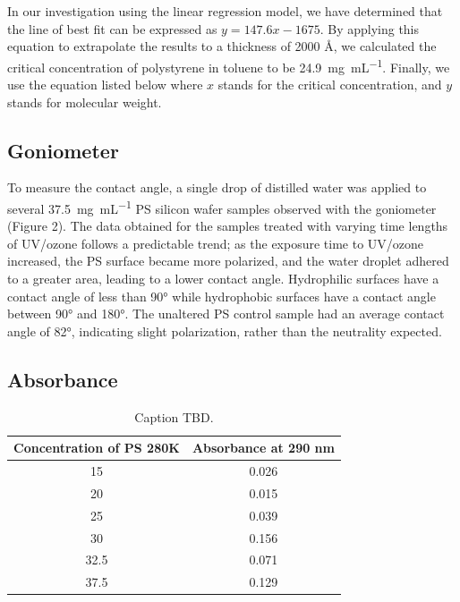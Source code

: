 \documentclass[twocolumn]{article}
\begin{document}
                In our investigation using the linear regression model, we have determined that the line of best fit can be expressed as $y = 147.6x - 1675$. By applying this equation to extrapolate the results to a thickness of 2000 \unit{\angstrom}, we calculated the critical concentration of polystyrene in toluene to be \qty{24.9}{\milli\gram\per\milli\liter}. Finally, we use the equation listed below where $x$ stands for the critical concentration, and $y$ stands for molecular weight.

            \subsection{Goniometer}
                To measure the contact angle, a single drop of distilled water was applied to several \qty{37.5}{\milli\gram\per\milli\liter} PS silicon wafer samples observed with the goniometer (Figure 2). The data obtained for the samples treated with varying time lengths of UV/ozone follows a predictable trend; as the exposure time to UV/ozone increased, the PS surface became more polarized, and the water droplet adhered to a greater area, leading to a lower contact angle. Hydrophilic surfaces have a contact angle of less than 90° while hydrophobic surfaces have a contact angle between 90° and 180°. The unaltered PS control sample had an average contact angle of 82°, indicating slight polarization, rather than the neutrality expected.
            
            \subsection{Absorbance}

                \begin{table}
                    \centering
                    \begin{tabular}{@{}cc@{}}
                        \toprule
                        Concentration of PS 280K & Absorbance at 290 nm \\ \midrule
                        15                                & 0.026                \\
                        20                                & 0.015                \\
                        25                                & 0.039                \\
                        30                                & 0.156                \\
                        32.5                              & 0.071                \\
                        37.5                              & 0.129                \\ \bottomrule
                    \end{tabular}
                    \caption{Caption TBD.}\label{tab:abs}
                \end{table}
\end{document}
